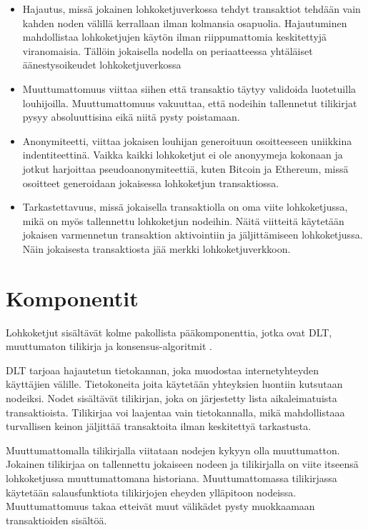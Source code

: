 \documentclass[utf8,bachelor]{gradu3}
\begin{document}
\begin{itemize}

\item Hajautus, missä jokainen lohkoketjuverkossa tehdyt transaktiot tehdään vain kahden noden välillä kerrallaan ilman kolmansia osapuolia. Hajautuminen mahdollistaa lohkoketjujen käytön ilman riippumattomia keskitettyjä viranomaisia. Tällöin jokaisella nodella on periaatteessa yhtäläiset äänestysoikeudet lohkoketjuverkossa

\item Muuttumattomuus viittaa siihen että transaktio täytyy validoida luotetuilla louhijoilla. Muuttumattomuus vakuuttaa, että nodeihin tallennetut tilikirjat pysyy absoluuttisina eikä niitä pysty poistamaan.


\item Anonymiteetti, viittaa jokaisen louhijan generoituun osoitteeseen uniikkina indentiteettinä. Vaikka kaikki lohkoketjut ei ole anonyymeja kokonaan ja jotkut harjoittaa pseudoanonymiteettiä, kuten Bitcoin ja Ethereum, missä osoitteet generoidaan jokaisessa lohkoketjun transaktiossa. 

\item Tarkastettavuus, missä jokaisella transaktiolla on oma viite lohkoketjussa, mikä on myös tallennettu lohkoketjun nodeihin. Näitä viitteitä käytetään jokaisen varmennetun transaktion aktivointiin ja jäljittämiseen lohkoketjussa. Näin jokaisesta transaktiosta jää merkki lohkoketjuverkkoon.
 
 \end{itemize}


\section{Komponentit}
Lohkoketjut sisältävät kolme pakollista pääkomponenttia, jotka ovat DLT, muuttumaton tilikirja ja konsensus-algoritmit \parencite{zarrin2021blockchain}.

DLT tarjoaa hajautetun tietokannan, joka muodostaa internetyhteyden käyttäjien välille. Tietokoneita joita käytetään yhteyksien luontiin kutsutaan nodeiksi.
Nodet sisältävät tilikirjan, joka on järjestetty lista aikaleimatuista transaktioista.
Tilikirjaa voi laajentaa vain tietokannalla, mikä mahdollistaaa turvallisen keinon jäljittää transaktoita ilman keskitettyä tarkastusta.

Muuttumattomalla tilikirjalla viitataan nodejen kykyyn olla muuttumatton.
Jokainen tilikirjaa on tallennettu jokaiseen nodeen ja tilikirjalla on viite itseensä lohkoketjussa muuttumattomana historiana.
Muuttumattomassa tilikirjassa käytetään salausfunktiota tilikirjojen eheyden ylläpitoon nodeissa.
Muuttumattomuus takaa etteivät muut välikädet pysty muokkaamaan transaktioiden sisältöä.
\end{document}
